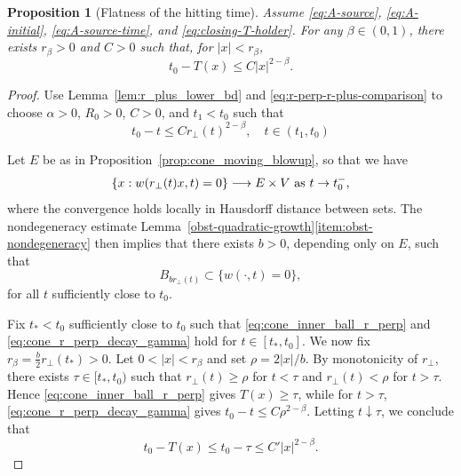 \documentclass[11pt]{amsart}
\numberwithin{equation}{section}
\numberwithin{figure}{section}
\theoremstyle{plain}
\newtheorem{prop}[thm]{Proposition}
\theoremstyle{definition}
\theoremstyle{remark}
\theoremstyle{plain}
\begin{document}
\begin{prop}[Flatness of the hitting time]\label{prop:cone_hitting_time_upper_bd}
  Assume \eqref{eq:A-source}, \eqref{eq:A-initial}, \eqref{eq:A-source-time}, and
  \eqref{eq:closing-T-holder}.
  For any $\beta\in(0,1)$, there exists $r_{\beta}>0$  and $C > 0$ such that, for $|x|<r_{\beta}$,
  \begin{equation*}
    t_0-T(x)\leq C|x|^{2-\beta}.
  \end{equation*}
\end{prop}
\begin{proof}
    Use Lemma~\ref{lem:r_plus_lower_bd} and
    \eqref{eq:r-perp-r-plus-comparison} to choose $\alpha>0$, $R_0 > 0$,
    $C > 0$, and $t_1 < t_0$ such that
    \begin{equation}\label{eq:cone_r_perp_decay_gamma}
        t_0 - t \leq Cr_\perp(t)^{2-\beta},
        \quad t\in (t_1, t_0)
    \end{equation}

    Let $E$ be as in Proposition~\ref{prop:cone_moving_blowup}, so
    that we have
    \[
        \{ x : w(r_\perp(t)x, t) = 0\}
        \longrightarrow E\times V \hbox{ as }t\to t_0^-,
    \]
    where the convergence holds locally in Hausdorff distance between sets.
    The nondegeneracy estimate
    Lemma~\ref{obst-quadratic-growth}\ref{item:obst-nondegeneracy} then
    implies that there exists $b>0$, depending only on $E$, such that
    \begin{equation}\label{eq:cone_inner_ball_r_perp}
     B_{br_\perp(t)}\subset \{ w(\cdot,t) = 0\},
    \end{equation}
    for all $t$ sufficiently close to $t_0$.
    
    Fix $t_*<t_0$ sufficiently close to $t_0$ such that
    \eqref{eq:cone_inner_ball_r_perp} and
    \eqref{eq:cone_r_perp_decay_gamma} hold for $t\in[t_*,t_0]$. We now fix
    $r_{\beta}=\frac{b}{2}r_\perp(t_*)>0$.
    Let $0<|x|<r_\beta$ and set $\rho=2|x|/b$. By monotonicity of
    $r_\perp$, there exists $\tau\in[t_*,t_0)$ such that
    $r_\perp(t)\geq\rho$ for $t<\tau$ and
    $r_\perp(t)<\rho$ for $t>\tau$. Hence
    \eqref{eq:cone_inner_ball_r_perp} gives $T(x)\geq\tau$, while for
    $t>\tau$, \eqref{eq:cone_r_perp_decay_gamma} gives
    $t_0-t\leq C\rho^{2-\beta}$. Letting $t\downarrow\tau$, we conclude that
    \begin{equation*}
        t_0-T(x)\leq t_0-\tau\leq C'|x|^{2-\beta}.
    \end{equation*}
\end{proof}
\end{document}

